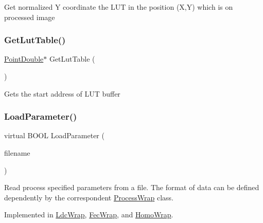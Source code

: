 Get normalized Y coordinate the L\+UT in the position (X,Y) which is on processed image \mbox{\label{class_process_wrap_a69ce0c8809b27258dd416b4a806b347d}} 
\subsubsection{\texorpdfstring{Get\+Lut\+Table()}{GetLutTable()}}
{\footnotesize\ttfamily \mbox{\hyperlink{struct___point_double}{Point\+Double}}$\ast$ Get\+Lut\+Table (\begin{DoxyParamCaption}{ }\end{DoxyParamCaption})\hspace{0.3cm}{\ttfamily [inline]}}

Gets the start address of L\+UT buffer \mbox{\label{class_process_wrap_a1cb75a423ff8f5ef736fc00a34792493}} 
\subsubsection{\texorpdfstring{Load\+Parameter()}{LoadParameter()}}
{\footnotesize\ttfamily virtual B\+O\+OL Load\+Parameter (\begin{DoxyParamCaption}\item[{L\+P\+C\+T\+S\+TR}]{filename }\end{DoxyParamCaption})\hspace{0.3cm}{\ttfamily [pure virtual]}}

Read process specified parameters from a file. The format of data can be defined dependently by the correspondent \mbox{\hyperlink{class_process_wrap}{Process\+Wrap}} class. 

Implemented in \mbox{\hyperlink{class_ldc_wrap_a5409cdfe65bc28ec3779f35eb3af22b4}{Ldc\+Wrap}}, \mbox{\hyperlink{class_fec_wrap_a3f55d86b6b99108b360b66d1d180a66c}{Fec\+Wrap}}, and \mbox{\hyperlink{class_homo_wrap_a5409cdfe65bc28ec3779f35eb3af22b4}{Homo\+Wrap}}.

\mbox{\label{class_process_wrap_a14eafff7a715fb84f7b3a3b2dc37bd0c}} 

